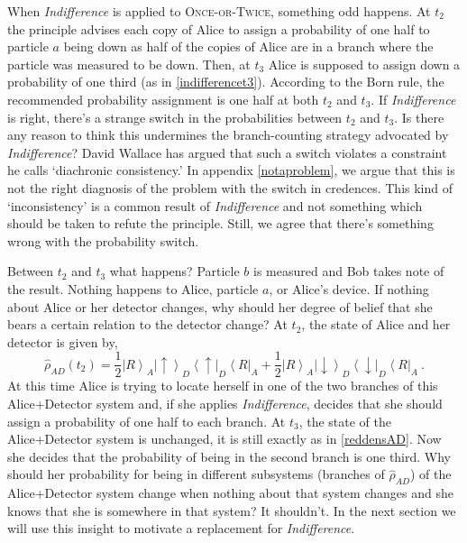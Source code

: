 \documentclass[onecolumn,secnumarabic,amsmath,amssymb,balancelastpage,nofootinbib]{article}
\newcommand{\bra}[1]{\ensuremath{\left\langle#1\right|}}
\newcommand{\ket}[1]{\ensuremath{\left|#1\right\rangle}}
\begin{document}
When \emph{Indifference} is applied to \textsc{Once-or-Twice}, something odd happens.  At $t_2$ the principle advises each copy of Alice to assign a probability of one half to particle $a$ being down as half of the copies of Alice are in a branch where the particle was measured to be down.  Then, at $t_3$ Alice is supposed to assign down a probability of one third (as in \eqref{indifferencet3}).  According to the Born rule, the recommended probability assignment is one half at both $t_2$ and $t_3$.  If \emph{Indifference} is right, there's a strange switch in the probabilities between $t_2$ and $t_3$.  Is there any reason to think this undermines the branch-counting strategy advocated by \emph{Indifference}?  David Wallace has argued that such a switch violates a constraint he calls `diachronic consistency.' In appendix \ref{notaproblem}, we argue that this is not the right diagnosis of the problem with the switch in credences.  This kind of `inconsistency' is a common result of \emph{Indifference} and not something which should be taken to refute the principle.  Still, we agree that there's something wrong with the probability switch.

Between $t_2$ and $t_3$ what happens?  Particle $b$ is measured and Bob takes note of the result.  Nothing happens to Alice, particle $a$, or Alice's device.  If nothing about Alice or her detector changes, why should her degree of belief that she bears a certain relation to the detector change?  At $t_2$, the state of Alice and her detector is given by,
\begin{equation}
\widehat{\rho}_{AD}(t_2)=\frac{1}{2}\ket{R}_A\ket{\uparrow}_{D}\bra{\uparrow}_{D}\bra{R}_A+\frac{1}{2}\ket{R}_A\ket{\downarrow}_{D}\bra{\downarrow}_{D}\bra{R}_A\ .
\label{reddensAD}
\end{equation}
At this time Alice is trying to locate herself in one of the two branches of this Alice+Detector system and, if she applies \emph{Indifference}, decides that she should assign a probability of one half to each branch.  At $t_3$, the state of the Alice+Detector system is unchanged, it is still exactly as in \eqref{reddensAD}.  Now she decides that the probability of being in the second branch is one third.  Why should her probability for being in different subsystems (branches of $\widehat{\rho}_{AD}$) of the Alice+Detector system change when nothing about that system changes and she knows that she is somewhere in that system?  It shouldn't.  In the next section we will use this insight to motivate a replacement for \emph{Indifference}.
\end{document}
